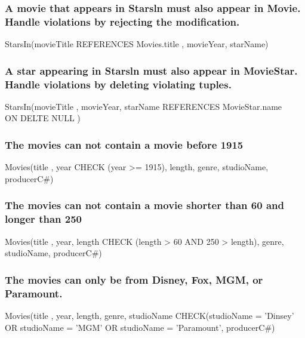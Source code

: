 \documentclass[12pt, a4paper]{article}
\begin{document}
				\subsubsection{A movie that appears in Starsln must also appear in Movie. Handle violations by rejecting the modification.}
					StarsIn(movieTitle REFERENCES Movies.title , movieYear, starName)\\		
				\subsubsection{A star appearing in Starsln must also appear in MovieStar. Handle violations by deleting violating tuples.}
					StarsIn(movieTitle , movieYear, starName REFERENCES MovieStar.name\\
						ON DELTE NULL )\\							
				\subsubsection{The movies can not contain a movie before 1915}
					Movies(title , year CHECK (year >= 1915), length, genre, studioName, producerC$\#$)\\					
				\subsubsection{The movies can not contain a movie shorter than 60 and longer than 250}
					Movies(title , year, length CHECK (length > 60 AND 250 > length), genre, studioName, producerC$\#$)\\
				\subsubsection{The movies can only be from Disney, Fox, MGM, or Paramount.}
					Movies(title , year, length, genre, studioName CHECK(studioName = 'Dinsey' OR studioName = 'MGM' OR studioName = 'Paramount', producerC$\#$)\\
\end{document}
